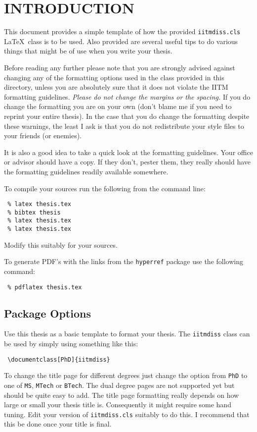 \chapter{INTRODUCTION} \label{chap:intro}
 
 This document provides a simple template of how the provided
 \verb+iitmdiss.cls+ \LaTeX\ class is to be used.  Also provided are
 several useful tips to do various things that might be of use when you
 write your thesis.
 
 Before reading any further please note that you are strongly advised
 against changing any of the formatting options used in the class
 provided in this directory, unless you are absolutely sure that it
 does not violate the IITM formatting guidelines.  \emph{Please do not
   change the margins or the spacing.}  If you do change the formatting
 you are on your own (don't blame me if you need to reprint your entire
 thesis).  In the case that you do change the formatting despite these
 warnings, the least I ask is that you do not redistribute your style
 files to your friends (or enemies).
 
 It is also a good idea to take a quick look at the formatting
 guidelines.  Your office or advisor should have a copy.  If they
 don't, pester them, they really should have the formatting guidelines
 readily available somewhere.
 
 To compile your sources run the following from the command line:
 \begin{verbatim}
 % latex thesis.tex
 % bibtex thesis
 % latex thesis.tex
 % latex thesis.tex
 \end{verbatim}
 Modify this suitably for your sources.
 
 To generate PDF's with the links from the \verb+hyperref+ package use
 the following command:
 \begin{verbatim}
 % pdflatex thesis.tex
 \end{verbatim}
 
 \section{Package Options}
 
 Use this thesis as a basic template to format your thesis.  The
 \verb+iitmdiss+ class can be used by simply using something like this:
 \begin{verbatim}
 \documentclass[PhD]{iitmdiss}  
 \end{verbatim}
 
 To change the title page for different degrees just change the option
 from \verb+PhD+ to one of \verb+MS+, \verb+MTech+ or \verb+BTech+.
 The dual degree pages are not supported yet but should be quite easy
 to add.  The title page formatting really depends on how large or
 small your thesis title is.  Consequently it might require some hand
 tuning.  Edit your version of \verb+iitmdiss.cls+ suitably to do this.
 I recommend that this be done once your title is final.
 
